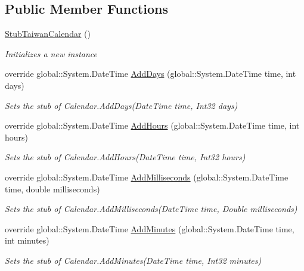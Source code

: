 \subsection*{Public Member Functions}
\begin{DoxyCompactItemize}
\item 
\hyperlink{class_system_1_1_globalization_1_1_fakes_1_1_stub_taiwan_calendar_aa4f784225480a23e2f24f008911a5e31}{Stub\-Taiwan\-Calendar} ()
\begin{DoxyCompactList}\small\item\em Initializes a new instance\end{DoxyCompactList}\item 
override global\-::\-System.\-Date\-Time \hyperlink{class_system_1_1_globalization_1_1_fakes_1_1_stub_taiwan_calendar_a647d52650ac4e4787b00c67dc24e5b02}{Add\-Days} (global\-::\-System.\-Date\-Time time, int days)
\begin{DoxyCompactList}\small\item\em Sets the stub of Calendar.\-Add\-Days(\-Date\-Time time, Int32 days)\end{DoxyCompactList}\item 
override global\-::\-System.\-Date\-Time \hyperlink{class_system_1_1_globalization_1_1_fakes_1_1_stub_taiwan_calendar_a2a4721c2a870e0d067614d93c53b3bbb}{Add\-Hours} (global\-::\-System.\-Date\-Time time, int hours)
\begin{DoxyCompactList}\small\item\em Sets the stub of Calendar.\-Add\-Hours(\-Date\-Time time, Int32 hours)\end{DoxyCompactList}\item 
override global\-::\-System.\-Date\-Time \hyperlink{class_system_1_1_globalization_1_1_fakes_1_1_stub_taiwan_calendar_aee6cfe01805430489a4d6e5cc4af279c}{Add\-Milliseconds} (global\-::\-System.\-Date\-Time time, double milliseconds)
\begin{DoxyCompactList}\small\item\em Sets the stub of Calendar.\-Add\-Milliseconds(\-Date\-Time time, Double milliseconds)\end{DoxyCompactList}\item 
override global\-::\-System.\-Date\-Time \hyperlink{class_system_1_1_globalization_1_1_fakes_1_1_stub_taiwan_calendar_a96010fb30f6f5dda9d614114a75c8f33}{Add\-Minutes} (global\-::\-System.\-Date\-Time time, int minutes)
\begin{DoxyCompactList}\small\item\em Sets the stub of Calendar.\-Add\-Minutes(\-Date\-Time time, Int32 minutes)\end{DoxyCompactList}\item 

\end{DoxyCompactItemize}

